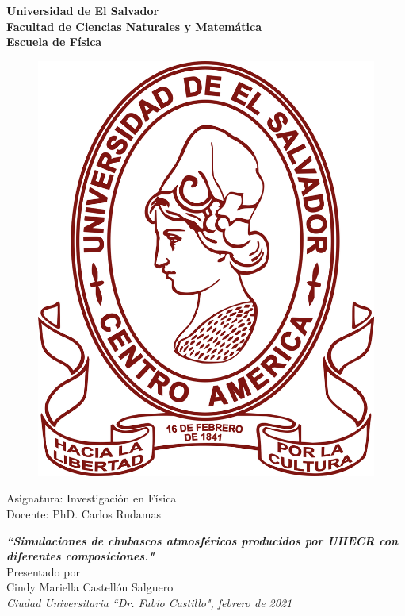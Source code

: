 \begin{titlepage}
	\begin{center}
	\LARGE
	\textbf{Universidad de El Salvador \\ 
	Facultad de Ciencias Naturales y Matemática  \\
	Escuela de Física}
	\end{center}
	
	\vspace{0.5cm}

	\begin{figure}[h]
	\centering
	\includegraphics[scale=0.12]{ues_logo.png}
	\end{figure}

	\vspace{0.5cm}
	
	\begin{center}
	\large	
	Asignatura: Investigación en Física \\
	Docente: PhD. Carlos Rudamas \\
	\vspace{1.0cm}
	
	\LARGE
	\textit{\textbf{``Simulaciones de chubascos atmosféricos producidos por UHECR con diferentes composiciones."}}\\
	
	\vspace{1.0cm}
	\large
	Presentado por\\
	Cindy Mariella Castellón Salguero\\
	\vspace{5.0cm}
	\textit{Ciudad Universitaria ``Dr. Fabio Castillo", febrero de 2021}
	\end{center}
\end{titlepage}